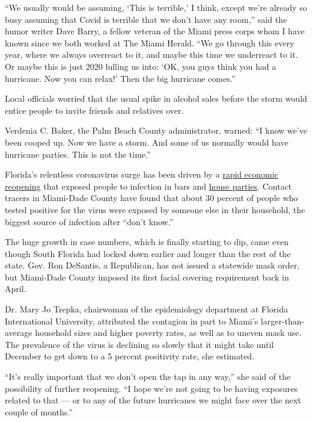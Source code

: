 ``We usually would be assuming, `This is terrible,' I think, except
we're already so busy assuming that Covid is terrible that we don't have
any room,'' said the humor writer Dave Barry, a fellow veteran of the
Miami press corps whom I have known since we both worked at The Miami
Herald. ``We go through this every year, where we always overreact to
it, and maybe this time we underreact to it. Or maybe this is just 2020
lulling us into: `OK, you guys think you had a hurricane. Now you can
relax!' Then the big hurricane comes.''

Local officials worried that the usual spike in alcohol sales before the
storm would entice people to invite friends and relatives over.

Verdenia C. Baker, the Palm Beach County administrator, warned: ``I know
we've been cooped up. Now we have a storm. And some of us normally would
have hurricane parties. This is not the time.''

Florida's relentless coronavirus surge has been driven by a
\href{https://www.nytimes3xbfgragh.onion/2020/06/26/us/coronavirus-florida-texas-bars-closing.html}{rapid
economic reopening} that exposed people to infection in bars and
\href{https://www.nytimes3xbfgragh.onion/2020/07/06/us/coronavirus-florida-miami.html}{house
parties}. Contact tracers in Miami-Dade County have found that about 30
percent of people who tested positive for the virus were exposed by
someone else in their household, the biggest source of infection after
``don't know.''

The huge growth in case numbers, which is finally starting to dip, came
even though South Florida had locked down earlier and longer than the
rest of the state. Gov. Ron DeSantis, a Republican, has not issued a
statewide mask order, but Miami-Dade County imposed its first facial
covering requirement back in April.

Dr. Mary Jo Trepka, chairwoman of the epidemiology department at Florida
International University, attributed the contagion in part to Miami's
larger-than-average household sizes and higher poverty rates, as well as
to uneven mask use. The prevalence of the virus is declining so slowly
that it might take until December to get down to a 5 percent positivity
rate, she estimated.

``It's really important that we don't open the tap in any way,'' she
said of the possibility of further reopening. ``I hope we're not going
to be having exposures related to that --- or to any of the future
hurricanes we might face over the next couple of months.''

